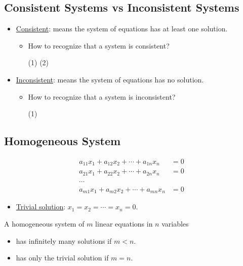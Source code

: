 \documentclass[12pt,a4paper]{article}
\begin{document}
\subsection{Consistent Systems vs Inconsistent Systems}

	\begin{itemize}
	\item \underline{Consistent}: means the system of equations has at least one solution.
		\begin{itemize}
		\item How to recognize that a system is consistent?
		
		(1) \hfill (2) \hfill \phantom{2}
		\vspace*{2cm}
		\end{itemize}
	\item \underline{Inconsistent}: means the system of equations has no solution.
		\begin{itemize}
		\item How to recognize that a system is inconsistent?
		
		(1) 
		\vspace*{2cm}
		\end{itemize}
	\end{itemize}
	
\subsection{Homogeneous System}
\begin{align*}
a_{11} x_1 + a_{12} x_2 + \cdots + a_{1n} x_n & = 0 \\
a_{21} x_1 + a_{22} x_2 + \cdots + a_{2n} x_n & = 0 \\
\cdots \phantom{222222222} & \\
a_{m1} x_1 + a_{m2} x_2 + \cdots + a_{mn} x_n & = 0 
\end{align*}

\begin{itemize}
\item \underline{Trivial solution}: $x_1 = x_2 = \cdots = x_n = 0$.
\end{itemize}

\begin{theorem}
A homogeneous system of $m$ linear equations in $n$ variables
	\begin{itemize}
	\item has infinitely many solutions if $m < n$.
	\item has only the trivial solution if $m= n$.
	\end{itemize}
\end{theorem}
\end{document}

